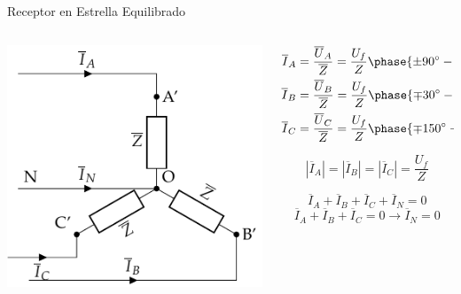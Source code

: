 \documentclass[aspectratio=169, usenames,svgnames,dvipsnames]{beamer}
\begin{document}
\begin{frame}[label={sec:org2299dec}]{Receptor en Estrella Equilibrado}
\begin{columns}
\begin{column}{0.5\columnwidth}
\begin{center}
\includegraphics[width=.9\linewidth]{../figs/EstrellaEquilibrado_Receptor.pdf}
\end{center}
\end{column}

\begin{column}{0.5\columnwidth}
\begin{align*}
  \overline{I}_A &= \frac{\overline{U}_A}{\overline{Z}} = \frac{U_f}{Z}\phase{\ang{\pm 90} - \varphi} \\
  \overline{I}_B &= \frac{\overline{U}_B}{\overline{Z}} = \frac{U_f}{Z}\phase{\ang{\mp 30} - \varphi}\\
  \overline{I}_C &= \frac{\overline{U}_C}{\overline{Z}} = \frac{U_f}{Z}\phase{\ang{\mp 150} - \varphi}
\end{align*}


\[
  \boxed{|\overline{I}_A| = |\overline{I}_B| = |\overline{I}_C| = \frac{U_f}{Z}}
\]

\[
  \overline{I}_A  + \overline{I}_B + \overline{I}_C + \overline{I}_N = 0
\]
\[
   \overline{I}_A  + \overline{I}_B + \overline{I}_C  = 0 \rightarrow \boxed{\overline{I}_N = 0}
\]
\end{column}
\end{columns}
\end{frame}
\end{document}
